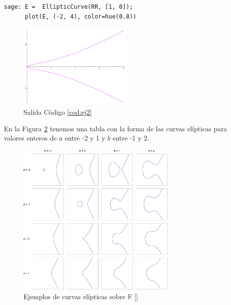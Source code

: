 \documentclass[11pt]{article}
\begin{document}
\begin{lstlisting}[label={cod:ej2}, caption={Curva elíptica $y^2=x^3+x$}, morekeywords={sage}]
sage: E =  EllipticCurve(RR, [1, 0]);
      plot(E, (-2, 4), color=hue(0.8))
\end{lstlisting}

\begin{figure}[H]
    \centering
    \includegraphics[width=0.5\textwidth]{ej2}
    \caption{Salida Código \ref{cod:ej2}}
    \label{fig:ej2}
\end{figure}

En la Figura \ref{fig:EllipticCurveCatalog} tenemos una tabla con la forma de las curvas elípticas para valores enteros de $a$ entre -2 y 1 y $b$ entre -1 y 2.

\begin{figure}[H]
    \centering
    \includegraphics[width=0.7\textwidth]{EllipticCurveCatalog}
    \caption{Ejemplos de curvas elípticas sobre $\mathbb{R}$ []}
    \label{fig:EllipticCurveCatalog}
\end{figure}
\end{document}
